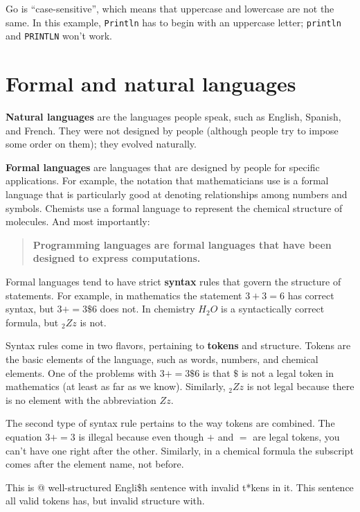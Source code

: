  Go is ``case-sensitive'', which means that uppercase
and lowercase are not the same. In this example, {\tt Println} has to begin
with an uppercase letter; {\tt println} and {\tt PRINTLN} won't work.


\section{Formal and natural languages}

{\bf Natural languages} are the languages people speak, such as English,
Spanish, and French. They were not designed by people (although people try to
impose some order on them); they evolved naturally.

{\bf Formal languages} are languages that are designed by people for specific
applications. For example, the notation that mathematicians use is a formal
language that is particularly good at denoting relationships among numbers and
symbols. Chemists use a formal language to represent the chemical structure of
molecules. And most importantly:

\begin{quote}
{\bf Programming languages are formal languages that have been
designed to express computations.}
\end{quote}

Formal languages tend to have strict {\bf syntax} rules that govern the
structure of statements. For example, in mathematics the statement $3 + 3 = 6$
has correct syntax, but $3 + = 3 \$ 6$ does not. In chemistry $H_2O$ is a
syntactically correct formula, but $_2Zz$ is not.

Syntax rules come in two flavors, pertaining to {\bf tokens} and structure.
Tokens are the basic elements of the language, such as words, numbers, and
chemical elements. One of the problems with $3 += 3 \$ 6$ is that \( \$ \) is
not a legal token in mathematics (at least as far as we know). Similarly,
$_2Zz$ is not legal because there is no element with the abbreviation $Zz$.

The second type of syntax rule pertains to the way tokens are
combined. The equation $3 += 3$ is illegal because even though $+$
and $=$ are legal tokens, you can't have one right after the other.
Similarly, in a chemical formula the subscript comes after the element
name, not before.

This is @ well-structured Engli\$h sentence with invalid t*kens in it. This
sentence all valid tokens has, but invalid structure with.

